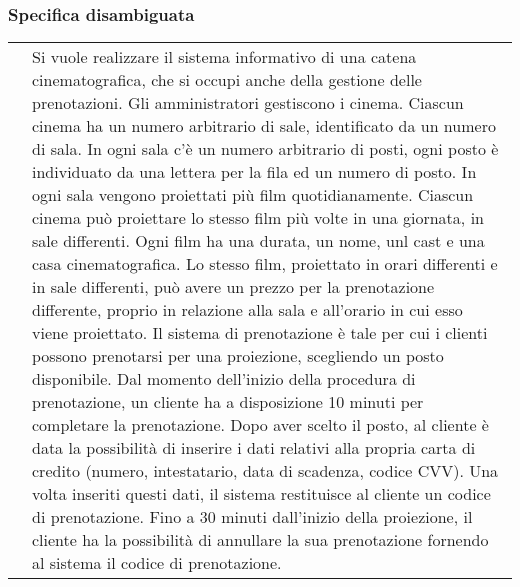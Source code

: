 \pagebreak
\subsubsection*{Specifica disambiguata}

\resetlinenumber[1]
\begin{tabularx}{\linewidth}{r|>{\internallinenumbers}X|}
      \cline{2-2} &
      Si vuole realizzare il sistema informativo di una catena cinematografica,
      che si occupi anche della gestione delle prenotazioni.
      \newline
      \newline
      Gli amministratori gestiscono i cinema.
      Ciascun cinema ha un numero arbitrario di sale, identificato da un
      numero di sala.
      In ogni sala c’è un numero arbitrario di posti, \linebreak
      ogni posto è individuato da una lettera per la fila ed un numero
      di posto.
      \newline
      \newline
      In ogni sala vengono proiettati più film quotidianamente.
      Ciascun cinema può proiettare lo stesso film più volte in una giornata,
      in sale differenti. Ogni film ha una durata, un nome, unl cast e una
      casa cinematografica.
      Lo stesso film, proiettato in orari differenti e in sale differenti,
      può avere un prezzo per la prenotazione differente, proprio in relazione
      alla sala e all’orario in cui esso viene proiettato.
      \newline
      \newline
      Il sistema di prenotazione è tale per cui i clienti possono prenotarsi
      per una proiezione, scegliendo un posto disponibile. Dal momento
      dell’inizio della procedura di prenotazione, un cliente ha a disposizione
      10 minuti per completare la prenotazione.
      Dopo aver scelto il  posto, al cliente è data la possibilità di inserire
      i dati relativi alla propria carta di credito
      (numero, intestatario, data di scadenza, codice CVV).
      Una volta inseriti questi dati, il sistema restituisce al cliente
      un codice di prenotazione.
      Fino a 30 minuti dall'inizio della proiezione, il cliente ha la
      possibilità di annullare la sua prenotazione fornendo al sistema il codice
      di prenotazione.
      \newline
      \newline

\end{tabularx}
